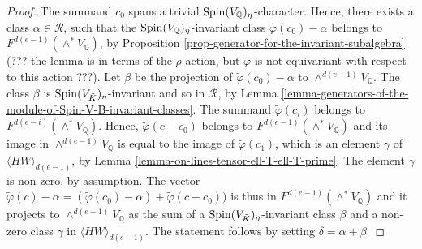 \documentclass[12pt]{amsart}
\numberwithin{equation}{subsection}
\theoremstyle{plain}
\theoremstyle{definition}
\newcommand{\CC}{{\mathbb C}}
\newcommand{\QQ}{{\mathbb Q}}
\newcommand{\R}{{\mathcal R}}
\newcommand{\Spin}{{\rm Spin}}
\begin{document}
{{\begin{proof}
The summand $c_0$ spans a trivial $\Spin(V_\QQ)_\eta$-character.
Hence, there exists a class $\alpha\in \R$, such that the $\Spin(V_\QQ)_\eta$-invariant class 
$\tilde{\varphi}(c_0)-\alpha$ belongs to $F^{d(e-1)}(\wedge^*V_\QQ)$, by Proposition \ref{prop-generator-for-the-invariant-subalgebra} (??? the lemma is in terms of the $\rho$-action, but $\tilde{\varphi}$ is not equivariant with respect to this action ???).
Let $\beta$ be the projection of $\tilde{\varphi}(c_0)-\alpha$ to $\wedge^{d(e-1)}V_\QQ$.
The class $\beta$ is $\Spin(V_{\tilde{K}})_\eta$-invariant and so in $\R$, by Lemma \ref{lemma-generators-of-the-module-of-Spin-V-B-invariant-classes}. 
The summand $\tilde{\varphi}(c_i)$ belongs to $F^{d(e-i)}(\wedge^*V_\QQ)$. Hence, $\tilde{\varphi}(c-c_0)$ belongs to $F^{d(e-1)}(\wedge^*V_\QQ)$
and its image in $\wedge^{d(e-1)}V_\QQ$ is equal to the image of $\tilde{\varphi}(c_1)$, 
which is an element $\gamma$ of $\langle HW\rangle_{d(e-1)}$, by Lemma \ref{lemma-on-lines-tensor-ell-T-ell-T-prime}. The element $\gamma$ 
is non-zero,  by assumption. The 
vector $\tilde{\varphi}(c)-\alpha=(\tilde{\varphi}(c_0)-\alpha)+\tilde{\varphi}(c-c_0))$ is thus in $F^{d(e-1)}(\wedge^*V_\QQ)$ and it projects to $\wedge^{d(e-1)}V_\QQ$ as 
the sum of a $\Spin(V_{\tilde{K}})_\eta$-invariant class $\beta$ and a non-zero class $\gamma$ in $\langle HW\rangle_{d(e-1)}$.
The statement follows by setting $\delta=\alpha+\beta$.
\end{proof}
}











}
\end{document}
